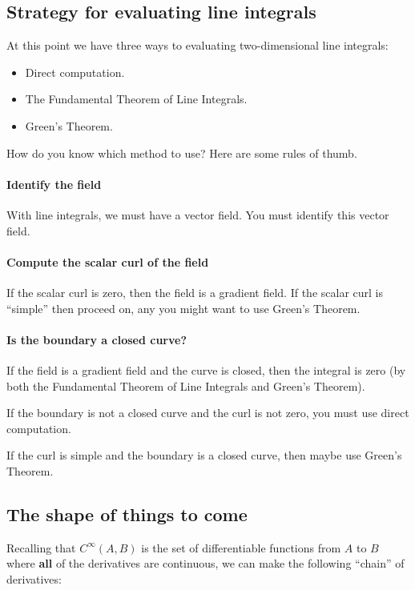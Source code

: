 \documentclass{ximera}
\begin{document}
\subsection{Strategy for evaluating line integrals}

At this point we have three ways to evaluating two-dimensional line
integrals:
\begin{itemize}
\item Direct computation.
\item The Fundamental Theorem of Line Integrals.
\item Green's Theorem.
\end{itemize}
How do you know which method to use? Here are some rules of thumb.

\paragraph{Identify the field}
With line integrals, we must have a vector field. You must identify this vector field. 


\paragraph{Compute the scalar curl of the field}
If the scalar curl is zero, then the field is a gradient field.
If the scalar curl is ``simple'' then proceed on, any you might want to use Green's Theorem.


\paragraph{Is the boundary  a closed curve?}
If the field is a gradient field and the curve is closed, then the
integral is zero (by both the Fundamental Theorem of Line Integrals
and Green's Theorem).

If the boundary is not a closed curve and the curl is not zero, you
must use direct computation.

If the curl is simple and the boundary is a closed curve, then maybe
use Green's Theorem.



\subsection{The shape of things to come}

Recalling that $C^\infty(A,B)$ is the set of differentiable functions
from $A$ to $B$ where \textbf{all} of the derivatives are continuous,
we can make the following ``chain'' of derivatives:
\end{document}
